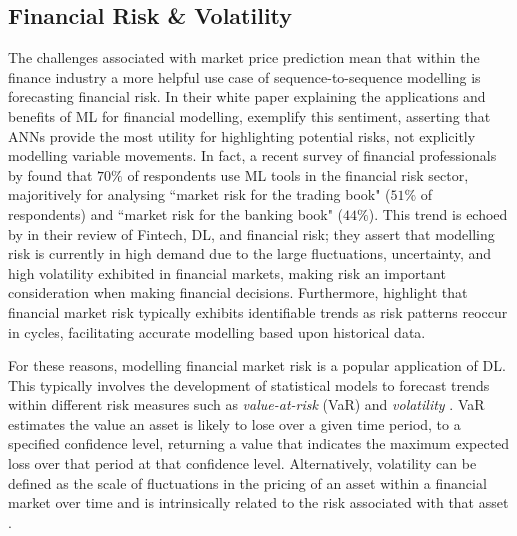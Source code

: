 \documentclass[a4paper, 11pt]{report}
\begin{document}
    \subsection{Financial Risk \& Volatility}

    The challenges associated with market price prediction mean that within the finance industry a more helpful use case of sequence-to-sequence modelling is forecasting financial risk. In their white paper explaining the applications and benefits of ML for financial modelling, \citet{laplante-2019} exemplify this sentiment, asserting that ANNs provide the most utility for highlighting potential risks, not explicitly modelling variable movements. In fact, a recent survey of financial professionals by \citet{chartis-2019} found that $70\%$ of respondents use ML tools in the financial risk sector, majoritively for analysing ``market risk for the trading book" ($51\%$ of respondents) and ``market risk for the banking book" ($44\%$). This trend is echoed by \citet{peng-2021} in their review of Fintech, DL, and financial risk; they assert that modelling risk is currently in high demand due to the large fluctuations, uncertainty, and high volatility exhibited in financial markets, making risk an important consideration when making financial decisions. Furthermore, \citet{mashrur-2020} highlight that financial market risk typically exhibits identifiable trends as risk patterns reoccur in cycles, facilitating accurate modelling based upon historical data.

    For these reasons, modelling financial market risk is a popular application of DL. This typically involves the development of statistical models to forecast trends within different risk measures such as \emph{value-at-risk} (VaR) and \emph{volatility} \citep{peng-2021}. VaR estimates the value an asset is likely to lose over a given time period, to a specified confidence level, returning a value that indicates the maximum expected loss over that period at that confidence level. Alternatively, volatility can be defined as the scale of fluctuations in the pricing of an asset within a financial market over time and is intrinsically related to the risk associated with that asset \citep{cavalcante-2016}.
    
\end{document}
